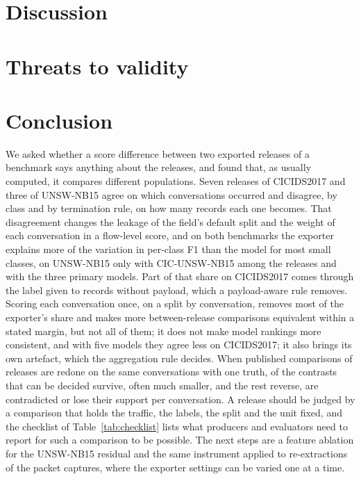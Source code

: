 \documentclass[pdflatex,sn-mathphys-num]{sn-jnl}
\newcommand{\cicids}{CICIDS2017}
\theoremstyle{thmstyleone}%
\theoremstyle{thmstylethree}%
\begin{document}
\section{Discussion}\label{sec:discussion}



\section{Threats to validity}\label{sec:threats}



\section{Conclusion}\label{sec:conclusion}

We asked whether a score difference between two exported releases of a benchmark says anything about the releases, and found that, as usually computed, it compares different populations. Seven releases of \cicids{} and three of UNSW-NB15 agree on which conversations occurred and disagree, by class and by termination rule, on how many records each one becomes. That disagreement changes the leakage of the field's default split and the weight of each conversation in a flow-level score, and on both benchmarks the exporter explains more of the variation in per-class F1 than the model for most small classes, on UNSW-NB15 only with CIC-UNSW-NB15 among the releases and with the three primary models. Part of that share on \cicids{} comes through the label given to records without payload, which a payload-aware rule removes. Scoring each conversation once, on a split by conversation, removes most of the exporter's share and makes more between-release comparisons equivalent within a stated margin, but not all of them; it does not make model rankings more consistent, and with five models they agree less on \cicids{}; it also brings its own artefact, which the aggregation rule decides. When published comparisons of releases are redone on the same conversations with one truth, \RQfiveSurvive{} of the \RevFiveDecided{} contrasts that can be decided survive, often much smaller, and the rest reverse, are contradicted or lose their support per conversation. A release should be judged by a comparison that holds the traffic, the labels, the split and the unit fixed, and the checklist of Table~\ref{tab:checklist} lists what producers and evaluators need to report for such a comparison to be possible. The next steps are a feature ablation for the UNSW-NB15 residual and the same instrument applied to re-extractions of the packet captures, where the exporter settings can be varied one at a time.
\end{document}

